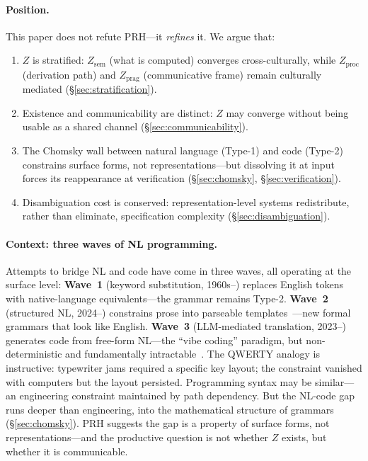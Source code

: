\documentclass{article}
\theoremstyle{definition}
\newcommand{\Zsem}{Z_{\text{sem}}}
\newcommand{\Zproc}{Z_{\text{proc}}}
\newcommand{\Zprag}{Z_{\text{prag}}}
\begin{document}
\paragraph{Position.} This paper does not refute PRH---it \emph{refines} it. We argue that:
\begin{enumerate}[label=(\roman*),nosep]
  \item $Z$ is stratified: $\Zsem$ (what is computed) converges cross-culturally, while $\Zproc$ (derivation path) and $\Zprag$ (communicative frame) remain culturally mediated (\S\ref{sec:stratification}).
  \item Existence and communicability are distinct: $Z$ may converge without being usable as a shared channel (\S\ref{sec:communicability}).
  \item The Chomsky wall between natural language (Type-1) and code (Type-2) constrains surface forms, not representations---but dissolving it at input forces its reappearance at verification (\S\ref{sec:chomsky}, \S\ref{sec:verification}).
  \item Disambiguation cost is conserved: representation-level systems redistribute, rather than eliminate, specification complexity (\S\ref{sec:disambiguation}).
\end{enumerate}

\paragraph{Context: three waves of NL programming.} Attempts to bridge NL and code have come in three waves, all operating at the surface level: \textbf{Wave~1} (keyword substitution, 1960s--) replaces English tokens with native-language equivalents---the grammar remains Type-2. \textbf{Wave~2} (structured NL, 2024--) constrains prose into parseable templates~\citep{core2025,elliott2023sudolang}---new formal grammars that look like English. \textbf{Wave~3} (LLM-mediated translation, 2023--) generates code from free-form NL---the ``vibe coding'' paradigm, but non-deterministic and fundamentally intractable~\citep{icse2026reproducibility}. The QWERTY analogy is instructive: typewriter jams required a specific key layout; the constraint vanished with computers but the layout persisted. Programming syntax may be similar---an engineering constraint maintained by path dependency. But the NL-code gap runs deeper than engineering, into the mathematical structure of grammars (\S\ref{sec:chomsky}). PRH suggests the gap is a property of surface forms, not representations---and the productive question is not whether $Z$ exists, but whether it is communicable.
\end{document}
